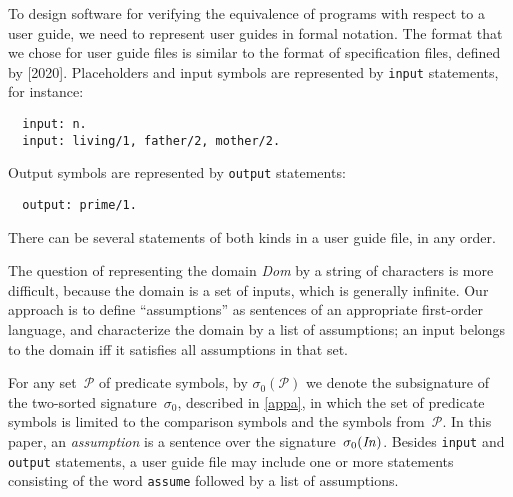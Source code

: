 \documentclass{new_tlp}
\newcommand{\PP}{\mathcal{P}}
\begin{document}
To design software for verifying the equivalence of
programs with respect to a user guide, we need to
represent user guides in formal notation.   The format that we chose for
user guide files is similar to the format of
specification files, defined by \cite{fan20} [2020].
Placeholders
and input symbols are represented by \verb|input| statements, for instance:
\begin{verbatim}
  input: n.
  input: living/1, father/2, mother/2.
\end{verbatim}
Output symbols are represented by \verb|output| statements:
\begin{verbatim}
  output: prime/1.
\end{verbatim}
There can be several statements of both kinds in a user guide file, in any
order.

The question of representing the domain \emph{Dom} by a string of
characters is more difficult, because the domain is a set of inputs,
which is generally infinite.
Our approach is to define ``assumptions'' as sentences of an
appropriate first-order language, and characterize the domain by a
list of assumptions; an input belongs to the domain iff it
satisfies all assumptions in that set.

For any set~$\PP$ of predicate symbols, by $\sigma_0(\PP)$ we denote the
subsignature of the two-sorted signature~$\sigma_0$, described in \ref{appa},
in which the set of predicate symbols
is limited to the comparison symbols and the symbols from~$\PP$.
In this paper, an \emph{assumption} is a sentence over the
signature~$\sigma_0(\emph{In\/})$.
Besides \verb|input| and \verb|output| statements, a user guide
file may include one or more statements consisting of the word
\verb|assume| followed by a list of assumptions.
\end{document}
